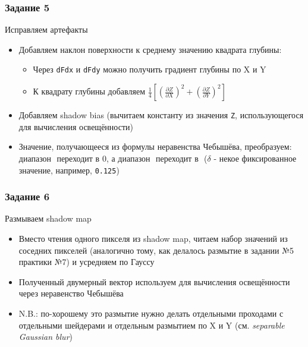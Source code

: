 \documentclass{beamer}
\begin{document}
\begin{frame}[fragile]
\frametitle{Задание 5}
Исправляем артефакты
\begin{itemize}
\item Добавляем наклон поверхности к среднему значению квадрата глубины:
\begin{itemize}
\item Через \verb|dFdx| и \verb|dFdy| можно получить градиент глубины по X и Y
\item К квадрату глубины добавляем \begin{math}\frac{1}{4}\left[\left(\frac{\partial Z}{\partial X}\right)^2 + \left(\frac{\partial Z}{\partial Y}\right)^2\right]\end{math}
\end{itemize}
\pause
\item Добавляем shadow bias (вычитаем константу из значения \verb|Z|, использующегося для вычисления освещённости)
\pause
\item Значение, получающееся из формулы неравенства Чебышёва, преобразуем: диапазон \begin{math}[0, \delta]\end{math} переходит в \begin{math}0\end{math}, а диапазон \begin{math}[\delta, 1]\end{math} переходит в \begin{math}[0, 1]\end{math} (\begin{math}\delta\end{math} - некое фиксированное значение, например, \verb|0.125|)
\end{itemize}
\end{frame}

\begin{frame}[fragile]
\frametitle{Задание 6}
Размываем shadow map
\begin{itemize}
\item Вместо чтения одного пикселя из shadow map, читаем набор значений из соседних пикселей (аналогично тому, как делалось размытие в задании №5 практики №7) и усредняем по Гауссу
\pause
\item Полученный двумерный вектор используем для вычисления освещённости через неравенство Чебышёва
\pause
\item {\color{red}N.B.}: по-хорошему это размытие нужно делать отдельными проходами с отдельными шейдерами и отдельным размытием по X и Y (см. \textit{separable Gaussian blur})
\end{itemize}
\end{frame}
\end{document}

